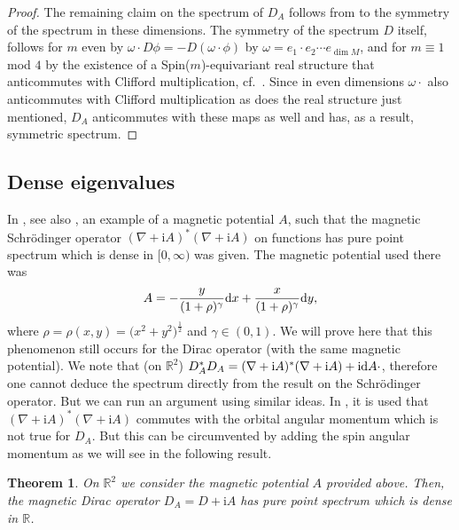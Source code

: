 \documentclass[10pt,a4paper]{amsart}
\numberwithin{equation}{section}
\newtheorem{Theorem}{Theorem}[section]
\begin{document}
\begin{proof}
The remaining claim on the spectrum of $D_A$ follows from to the symmetry of the spectrum in these dimensions. The symmetry of the spectrum $D$ itself, follows for $m$ even by $\omega \cdot D\phi =-D(\omega\cdot \phi)$ by $\omega= e_1\cdot e_2 \cdots   e_{\dim M}$, and for $m\equiv 1$ mod $4$ by the existence of a Spin($m$)-equivariant real structure that anticommutes with Clifford multiplication, cf.\ \cite[Proposition, p.~31]{Fr}. Since in even dimensions $\omega\cdot$ also anticommutes with Clifford multiplication as does the real structure just mentioned, $D_A$ anticommutes with these maps as well and has, as a result, symmetric spectrum.
\end{proof}

\subsection{Dense eigenvalues}
In \cite{MS}, see also \cite[Theorem~6.2]{CFKS}, an example of a magnetic potential $A$, such that the magnetic Schr\"odinger operator $(\nabla + {\mathrm{i}}A)^*(\nabla +{\mathrm{i}}A)$ on functions has pure point spectrum which is dense in $[0, \infty)$ was given. The magnetic potential used there was	
\[
A=-\frac{y}{(1+\rho)^\gamma} {\rm d}x+\frac{x}{(1+\rho)^\gamma} {\rm d}y,\]
 where $\rho=\rho(x,y)=\bigl(x^2+y^2\bigr)^\frac{1}{2}$ and $\gamma\in (0,1)$. We will prove here that this phenomenon still occurs for the Dirac operator (with the same magnetic potential). We note that \big(on ${\mathbb R}^2$\big) $D_A^*D_A =(\nabla + {\mathrm{i}}A)^*(\nabla +{\mathrm{i}}A) + {\mathrm{i}} {\rm d}A\cdot$, therefore one cannot deduce the spectrum directly from the result on the Schr\"odinger operator. But we can run an argument using similar ideas. In \cite[Theorem~6.2]{CFKS}, it is used that $(\nabla + {\mathrm{i}}A)^*(\nabla +{\mathrm{i}}A)$ commutes with the orbital angular momentum which is not true for $D_A$. But this can be circumvented by adding the spin angular momentum as we will see in the following result.

\begin{Theorem}\label{thm_dense} On $\mathbb R^2$ we consider the magnetic potential $A$ provided above.
Then, the magnetic Dirac operator $D_A= D+\mathrm{i}A$ has pure point spectrum which is dense in ${\mathbb R}$.
\end{Theorem}
\end{document}
